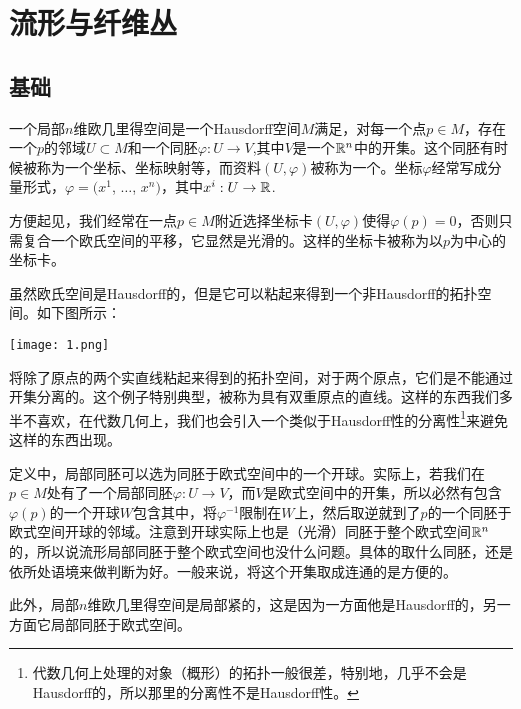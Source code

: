 \chapter{流形与纤维丛}
\section{基础}

\begin{para}
一个局部$n$维欧几里得空间是一个Hausdorff空间$M$满足，对每一个点$p\in M$，存在一个$p$的邻域$U\subset M$和一个同胚$\varphi:U\to V$,其中$V$是一个$\mathbb{R}^n$中的开集。这个同胚有时候被称为一个坐标、坐标映射等，而资料$(U,\varphi)$被称为一个。坐标$\varphi$经常写成分量形式，$\varphi=(x^1$, $\dots$, $x^n)$，其中$x^i:U\to \mathbb{R}$. 

方便起见，我们经常在一点$p\in M$附近选择坐标卡$(U,\varphi)$使得$\varphi(p)=0$，否则只需复合一个欧氏空间的平移，它显然是光滑的。这样的坐标卡被称为以$p$为中心的坐标卡。
\end{para}

虽然欧氏空间是Hausdorff的，但是它可以粘起来得到一个非Hausdorff的拓扑空间。如下图所示：
\begin{center}
\texttt{[image: 1.png]}
\end{center}
将除了原点的两个实直线粘起来得到的拓扑空间，对于两个原点，它们是不能通过开集分离的。这个例子特别典型，被称为具有双重原点的直线。这样的东西我们多半不喜欢，在代数几何上，我们也会引入一个类似于Hausdorff性的分离性\footnote{代数几何上处理的对象（概形）的拓扑一般很差，特别地，几乎不会是Hausdorff的，所以那里的分离性不是Hausdorff性。}来避免这样的东西出现。

定义中，局部同胚可以选为同胚于欧式空间中的一个开球。实际上，若我们在$p\in M$处有了一个局部同胚$\varphi:U\to V$，而$V$是欧式空间中的开集，所以必然有包含$\varphi(p)$的一个开球$W$包含其中，将$\varphi^{-1}$限制在$W$上，然后取逆就到了$p$的一个同胚于欧式空间开球的邻域。注意到开球实际上也是（光滑）同胚于整个欧式空间$\mathbb{R}^n$的，所以说流形局部同胚于整个欧式空间也没什么问题。具体的取什么同胚，还是依所处语境来做判断为好。一般来说，将这个开集取成连通的是方便的。

此外，局部$n$维欧几里得空间是局部紧的，这是因为一方面他是Hausdorff的，另一方面它局部同胚于欧式空间。

